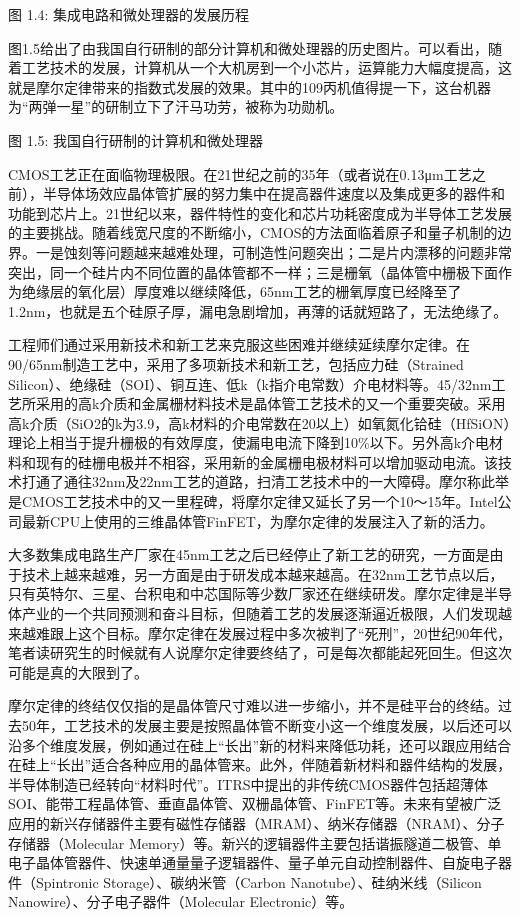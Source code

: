 \documentclass[]{ctexbook}
\begin{document}
图 1.4: 集成电路和微处理器的发展历程

图1.5给出了由我国自行研制的部分计算机和微处理器的历史图片。可以看出，随着工艺技术的发展，计算机从一个大机房到一个小芯片，运算能力大幅度提高，这就是摩尔定律带来的指数式发展的效果。其中的109丙机值得提一下，这台机器为``两弹一星''的研制立下了汗马功劳，被称为功勋机。

图 1.5: 我国自行研制的计算机和微处理器

CMOS工艺正在面临物理极限。在21世纪之前的35年（或者说在0.13μm工艺之前），半导体场效应晶体管扩展的努力集中在提高器件速度以及集成更多的器件和功能到芯片上。21世纪以来，器件特性的变化和芯片功耗密度成为半导体工艺发展的主要挑战。随着线宽尺度的不断缩小，CMOS的方法面临着原子和量子机制的边界。一是蚀刻等问题越来越难处理，可制造性问题突出；二是片内漂移的问题非常突出，同一个硅片内不同位置的晶体管都不一样；三是栅氧（晶体管中栅极下面作为绝缘层的氧化层）厚度难以继续降低，65nm工艺的栅氧厚度已经降至了1.2nm，也就是五个硅原子厚，漏电急剧增加，再薄的话就短路了，无法绝缘了。

工程师们通过采用新技术和新工艺来克服这些困难并继续延续摩尔定律。在90/65nm制造工艺中，采用了多项新技术和新工艺，包括应力硅（Strained Silicon）、绝缘硅（SOI）、铜互连、低k（k指介电常数）介电材料等。45/32nm工艺所采用的高k介质和金属栅材料技术是晶体管工艺技术的又一个重要突破。采用高k介质（SiO2的k为3.9，高k材料的介电常数在20以上）如氧氮化铪硅（HfSiON）理论上相当于提升栅极的有效厚度，使漏电电流下降到10\%以下。另外高k介电材料和现有的硅栅电极并不相容，采用新的金属栅电极材料可以增加驱动电流。该技术打通了通往32nm及22nm工艺的道路，扫清工艺技术中的一大障碍。摩尔称此举是CMOS工艺技术中的又一里程碑，将摩尔定律又延长了另一个10～15年。Intel公司最新CPU上使用的三维晶体管FinFET，为摩尔定律的发展注入了新的活力。

大多数集成电路生产厂家在45nm工艺之后已经停止了新工艺的研究，一方面是由于技术上越来越难，另一方面是由于研发成本越来越高。在32nm工艺节点以后，只有英特尔、三星、台积电和中芯国际等少数厂家还在继续研发。摩尔定律是半导体产业的一个共同预测和奋斗目标，但随着工艺的发展逐渐逼近极限，人们发现越来越难跟上这个目标。摩尔定律在发展过程中多次被判了``死刑''，20世纪90年代，笔者读研究生的时候就有人说摩尔定律要终结了，可是每次都能起死回生。但这次可能是真的大限到了。

摩尔定律的终结仅仅指的是晶体管尺寸难以进一步缩小，并不是硅平台的终结。过去50年，工艺技术的发展主要是按照晶体管不断变小这一个维度发展，以后还可以沿多个维度发展，例如通过在硅上``长出''新的材料来降低功耗，还可以跟应用结合在硅上``长出''适合各种应用的晶体管来。此外，伴随着新材料和器件结构的发展，半导体制造已经转向``材料时代''。ITRS中提出的非传统CMOS器件包括超薄体SOI、能带工程晶体管、垂直晶体管、双栅晶体管、FinFET等。未来有望被广泛应用的新兴存储器件主要有磁性存储器（MRAM）、纳米存储器（NRAM）、分子存储器（Molecular Memory）等。新兴的逻辑器件主要包括谐振隧道二极管、单电子晶体管器件、快速单通量量子逻辑器件、量子单元自动控制器件、自旋电子器件（Spintronic Storage）、碳纳米管（Carbon Nanotube）、硅纳米线（Silicon Nanowire）、分子电子器件（Molecular Electronic）等。
\end{document}
